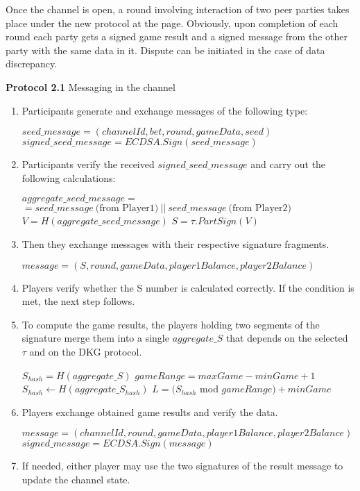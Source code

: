 Once the channel is open, a round involving interaction of two peer parties takes place under the new protocol at the  \pageref{intchannel1} page. Obviously, upon completion of each round each party gets a signed game result and a signed message from the other party with the same data in it. Dispute can be initiated in the case of data discrepancy.
\begin{algorithm} 
\caption*{\textbf{Protocol 2.1} Messaging in the channel}
\begin{enumerate}
	\item Participants generate and exchange messages of the following type:
 \label{intchannel1}
\begin{center}
$ seed\_message = (channelId, bet, round, gameData, seed)$
$signed\_seed\_message = ECDSA.Sign(seed\_message)$ 
\end{center}
	\item Participants verify the received $signed\_seed\_message$ and carry out the following calculations:
 \begin{algorithmic}
\State $aggregate\_seed\_message =$ \\ $= seed\_message \  \text{(from Player1)} \ ||  \ seed\_message \  \text{(from Player2)}$
\State $V = H(aggregate\_seed\_message)$
\State $S =  \tau .PartSign(V)$
 \end{algorithmic}
\item Then they exchange messages with their respective signature fragments.
\begin{center}
 $message = (S, round, gameData, player1Balance, player2Balance)$
\end{center}
	\item Players verify whether the S number is calculated correctly. If the condition is met, the next step follows.
	\item To compute the game results, the players holding two segments of the signature merge them into a single $aggregate\_S$ that depends on the selected  $\tau$ and on the DKG protocol.
\begin{algorithmic}
\State $S_{hash} = H(aggregate\_S)$
\State $gameRange = maxGame -  minGame + 1$
\State$ S_{hash}\gets H(aggregate\_S_{hash})$
\EndWhile
\State $L = (S_{hash}$ mod $gameRange) + minGame$
\end{algorithmic}
\end{enumerate}
\end{algorithm}
\begin{algorithm}
\begin{enumerate}
\setcounter{enumi}{5}
 \item Players exchange obtained game results and verify the data. 
\begin{center}
 $message = (channelId, round, gameData, player1Balance, player2Balance)$
 $signed\_message = ECDSA.Sign(message)$
\end{center}
\item If needed, either player may use the two signatures of the result message to update the channel state.
\end{enumerate}
\end{algorithm}

